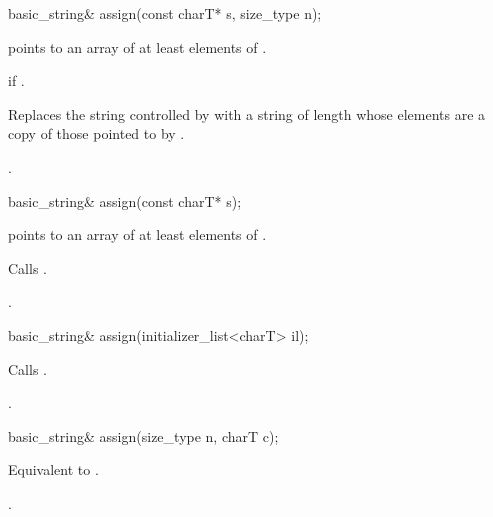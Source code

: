 %
%
\begin{itemdecl}
basic_string& assign(const charT* s, size_type n);
\end{itemdecl}

\begin{itemdescr}
\pnum
\requires {} points to an array of at least  elements of .

\pnum
\throws {} if .

\pnum
\effects Replaces the string controlled by  with a string
of length  whose elements are a copy of those pointed to by .

\pnum
\returns
{}.
\end{itemdescr}

%
%
\begin{itemdecl}
basic_string& assign(const charT* s);
\end{itemdecl}

\begin{itemdescr}
\pnum
\requires {} points to an array of at least 
elements of .

\pnum
\effects Calls .

\pnum
\returns
{}.
\end{itemdescr}

%
%
\begin{itemdecl}
basic_string& assign(initializer_list<charT> il);
\end{itemdecl}

\begin{itemdescr}
\pnum
\effects Calls .

\pnum
{}.
\end{itemdescr}


%
\begin{itemdecl}
basic_string& assign(size_type n, charT c);
\end{itemdecl}

\begin{itemdescr}
\pnum
\pnum
\effects Equivalent to .

\pnum
\returns
{}.
\end{itemdescr}

